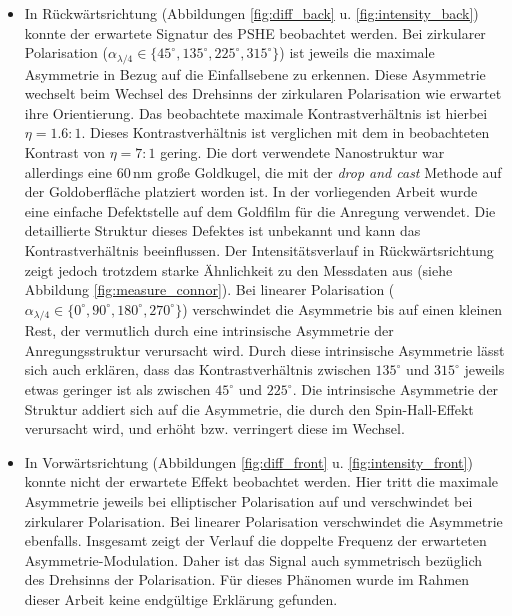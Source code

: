 \documentclass[titlepage,  ngerman]{article}
\begin{document}
		\begin{itemize}
			\item In Rückwärtsrichtung (Abbildungen \ref{fig:diff_back} u. \ref{fig:intensity_back}) konnte der erwartete Signatur des PSHE beobachtet werden. Bei zirkularer Polarisation ($\alpha_{\lambda/4} \in \{45^\circ, 135^\circ, 225^\circ, 315^\circ\}$) ist jeweils die maximale Asymmetrie in Bezug auf die Einfallsebene zu erkennen. Diese Asymmetrie wechselt beim Wechsel des Drehsinns der zirkularen Polarisation wie erwartet ihre Orientierung. Das beobachtete maximale Kontrastverhältnis ist hierbei $\eta = 1.6:1$. Dieses Kontrastverhältnis ist verglichen mit dem in \cite{OConnor.2014} beobachteten Kontrast von $\eta =7:1$ gering.  Die dort verwendete Nanostruktur war allerdings eine  $60\,\mathrm{nm}$ große Goldkugel, die mit der \textit{drop and cast} Methode auf der Goldoberfläche platziert worden ist. In der vorliegenden Arbeit wurde eine einfache Defektstelle auf dem Goldfilm für die Anregung verwendet. Die detaillierte Struktur dieses Defektes ist unbekannt und kann das Kontrastverhältnis beeinflussen. Der Intensitätsverlauf in Rückwärtsrichtung zeigt jedoch trotzdem starke Ähnlichkeit zu den Messdaten aus \cite{OConnor.2014} (siehe Abbildung \ref{fig:measure_connor}). Bei linearer Polarisation ($\alpha_{\lambda/4} \in \{0^\circ, 90^\circ, 180^\circ, 270^\circ\}$) verschwindet die Asymmetrie bis auf einen kleinen Rest, der vermutlich durch eine intrinsische Asymmetrie der Anregungsstruktur verursacht wird. Durch diese intrinsische Asymmetrie lässt sich auch erklären, dass das Kontrastverhältnis zwischen $135^\circ$ und $ 315^\circ$ jeweils etwas geringer ist als zwischen $45^\circ$ und $225^\circ$.
			Die intrinsische Asymmetrie der Struktur addiert sich auf die Asymmetrie, die durch den Spin-Hall-Effekt verursacht wird, und erhöht bzw. verringert diese im Wechsel.
			\item In Vorwärtsrichtung (Abbildungen \ref{fig:diff_front} u. \ref{fig:intensity_front}) konnte nicht der erwartete Effekt beobachtet werden. Hier tritt die maximale Asymmetrie jeweils bei elliptischer Polarisation auf und verschwindet bei zirkularer Polarisation. Bei linearer Polarisation verschwindet die Asymmetrie ebenfalls. Insgesamt zeigt der Verlauf die doppelte Frequenz der erwarteten Asymmetrie-Modulation. Daher ist das Signal auch symmetrisch bezüglich des Drehsinns der Polarisation. Für dieses Phänomen wurde im Rahmen dieser Arbeit keine endgültige Erklärung gefunden.
			

\end{itemize}
\end{document}
